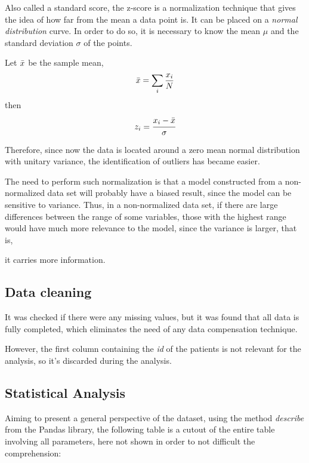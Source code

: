 \documentclass[conference]{IEEEtran}
\begin{document}
Also called a standard score, the z-score is a normalization technique that gives the 
idea of how far from the mean a data point is. It can be placed on a 
\textit{normal distribution} curve. In order to do so, it is necessary to know the 
mean $\mu$ and the standard deviation $\sigma$ of the points.

Let $\Bar{x}$ be the sample mean,
$$\Bar{x} = \sum_i \frac{x_i}{N}$$
then
$$z_i = \cfrac{x_i - \Bar{x}}{\sigma}$$

Therefore, since now the data is located around a zero mean normal distribution with 
unitary variance, the identification of outliers has became easier.

The need to perform such normalization is that a model constructed from a 
non-normalized data set will probably have a biased result, since the model can be 
sensitive to variance. Thus, in a non-normalized data set, if there are large 
differences between the range of some variables, those with the highest range would 
have much more relevance to the model, since the variance is larger, that is, 

it carries more information.

\subsection{Data cleaning}\label{AA}
It was checked if there were any missing values, but it was found that all data is fully completed, 
which eliminates the need of any data compensation technique.

However, the first column containing the \textit{id} of the patients is not relevant for the analysis, so it's discarded during the analysis.
\subsection{Statistical Analysis}

Aiming to present a general perspective of the dataset, using the method \textit{describe} from the Pandas library, the following table is a cutout of the entire table involving all parameters, here not shown in order to not difficult the comprehension: 
\end{document}
